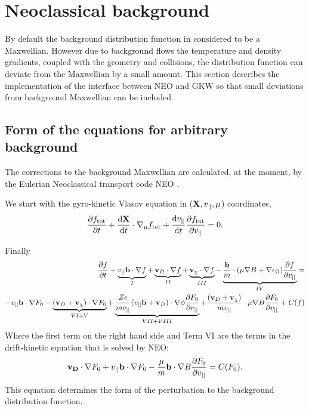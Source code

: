 
\chapter{Neoclassical background}

By default the background distribution function in considered to be a Maxwellian.  However due to background flows the temperature and density 
gradients, coupled with the geometry and collisions, the distribution function can deviate from the Maxwellian by a small amount.   This section describes the implementation of the interface between NEO and GKW so that small deviations from background Maxwellian can be included.

\section{Form of the equations for arbitrary background}

The corrections to the background Maxwellian are calculated, at the moment, by the Eulerian
Neoclassical transport code {\small NEO} \cite{NEO1,NEO2}.  

We start with the gyro-kinetic Vlasov equation in (${\bf X}, v_\parallel, 
\mu$) coordinates,
\begin{equation}
{\partial f_{\rm tot} \over \partial t} + {{\rm d} {\bf X} \over {\rm d} t} \cdot \nabla_\mu 
f_{\rm tot} + {{\rm d} v_\parallel \over {\rm d} t} {\partial f_{\rm tot} \over \partial v_\parallel} = 0 .
\label{eq:neoclassics-vlasov}
\end{equation}

Finally
\begin{eqnarray}
\frac{\partial f}{\partial t} + \underbrace{v_{||}{\bf b}\cdot\nabla f}_{I} + \underbrace{{\bf v}_D\cdot\nabla f}_{II} + \underbrace{{\bf v}_\chi \cdot\nabla f}_{III} - \underbrace{\frac{{\bf b}}{m}\cdot (\mu\nabla B + \nabla\epsilon_\Omega)\frac{\partial f}{\partial v_{||}}}_{IV} = \\
-v_{||}{\bf b}\cdot\nabla F_{0} -\underbrace{({\bf v}_D + {\bf v}_\chi)\cdot\nabla F_{0}}_{VI + V} + \underbrace{\frac{Ze}{mv_{||}}(v_{||}{\bf b} + {\bf v}_D)\cdot\nabla\phi \frac{\partial F_{0}}{\partial v_{||}}}_{VII + VIII} + \frac{({\bf v}_D + {\bf v}_\chi)}{mv_{||}}\cdot\mu\nabla B\frac{\partial F_{0}}{\partial v_{||}} + C(f)
\end{eqnarray}
Where the first term on the right hand side and Term VI are the terms in the drift-kinetic equation that is solved by NEO:
\begin{equation}
{\bf v_{D}}\cdot\nabla F_{0}+ v_{||}{\bf b}\cdot\nabla F_{0} -\frac{\mu}{m}{\bf b}\cdot\nabla B\frac{\partial F_{0}}{\partial v_{||}}= C(F_{0}).
\end{equation}
This equation determines the form of the perturbation to the background distribution function.

